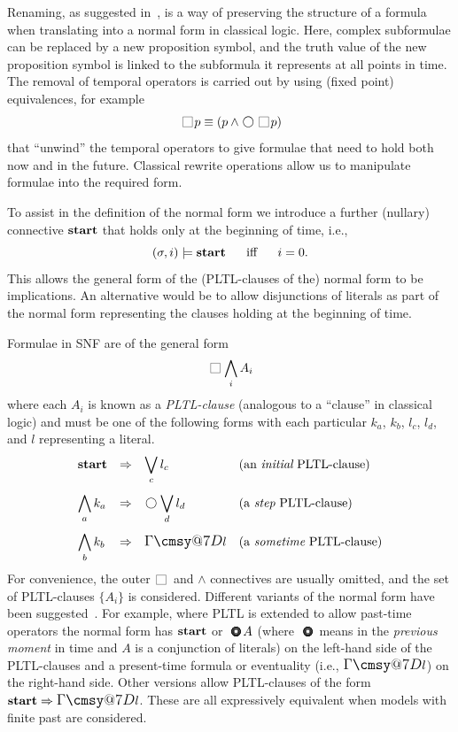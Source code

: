 \documentclass[nohyperref]{acmtrans2f}
\makeatletter
\def\sometime{\mathord{\hbox{\large$\mathchar"0\cmsy@7D$}}}
\newcommand{\always}{\raisebox{-.2ex}{
                           \mbox{\unitlength=0.9ex
                           \begin{picture}(2,2)
                           \linethickness{0.06ex}
                           \put(0,0){\line(1,0){2}}
                           \put(0,2){\line(1,0){2}}
                           \put(0,0){\line(0,1){2}}
                           \put(2,0){\line(0,1){2}}
                           \end{picture}}}
                          \,}
\newcommand{\next}{\!\raisebox{-.2ex}{ %
                        \mbox{\unitlength=0.9ex
                        \begin{picture}(2,2)
                        \linethickness{0.06ex}
                        \put(1,1){\circle{2}} %
                        \end{picture}}}       %
                        \,}
\newcommand{\slast}{\raisebox{-.2ex}{
                        \mbox{\unitlength=0.9ex
                        \begin{picture}(2,2)
                        \linethickness{0.9ex}   %
                        \put(1,1){\circle{0.9}}
                        \put(1,1){\circle{1.0}}
                        \put(1,1){\circle{1.2}}
                        \put(1,1){\circle{1.4}}
                        \put(1,1){\circle{1.6}}
                        \put(1,1){\circle{1.8}}
                        \put(1,1){\circle{1.86}}
                        \put(1,1){\circle{1.92}}
                        \end{picture}}}
                        \,}
\let\imp=\Rightarrow
\def\lstart{\hbox{\rm\bf start}}
\makeatother
\begin{document}
Renaming, as suggested in~, is a way of
preserving the structure of a formula when translating into a normal
form in classical logic. Here, complex subformulae can be replaced by
a new proposition symbol, and the truth value of the new proposition symbol
is linked 
to the subformula it represents at all points in time. The removal of
temporal operators is carried out by using (fixed point) equivalences,
for example
$$
\always p \equiv (p \land \next \always p)
$$
that ``unwind'' the temporal operators to give formulae that need to
hold both now and in the future. Classical rewrite operations allow us
to manipulate formulae into the required form.

To assist in the definition of the normal form we introduce a further
(nullary) connective $\lstart$ that holds only at the beginning of time,
i.e.,
$$
 (\sigma, i) \models \lstart~~~~ \mbox{ iff }~~~~ i =0.
$$
This allows the general form of the (PLTL-clauses of the) normal form to be implications. An
alternative would be to allow disjunctions of literals as part of the
normal form representing the clauses holding at the beginning of time.

Formulae in SNF are of the general form
 $$
 \always\bigwedge_i A_i
 $$
%
where each $A_i$ is known as a {\em PLTL-clause\/} (analogous to a ``clause''
in classical logic)
and must be one of the following forms with each particular $k_a$,
$k_b$, $l_c$, $l_d$, and $l$ representing a literal.
%
$$
\begin{array}{lcll}
\lstart    &\imp & \displaystyle\bigvee_{c} l_c
	 \qquad& \hbox{\rm (an {\em initial} PLTL-clause)}\\[4ex]
\displaystyle\bigwedge_{a} k_a        &\imp 
	 & \next \displaystyle\bigvee_{d} l_d
		 & \hbox{\rm (a {\em step} PLTL-clause)}\\[4ex]
\displaystyle\bigwedge_{b} k_b        &\imp & \sometime l
		 & \hbox{\rm (a {\em sometime} PLTL-clause)}
\end{array}
$$
%
For convenience, the outer $\!\always$ and $\land$ connectives are
usually omitted, and the set of PLTL-clauses $\{A_i\}$ is considered.
Different variants of the normal form have been
suggested~\cite{Fisher91normalizing,FisherNoel90syn,Fisher97:JLC}. For
example, where PLTL is extended to allow past-time operators the normal
form has $\lstart$ or $\slast A$ (where $\slast$ means in the {\em
previous moment} in time and $A$ is a conjunction of literals) on the
left-hand side of the PLTL-clauses and a present-time formula or eventuality
(i.e., $\sometime l$) on the right-hand side. Other versions allow
PLTL-clauses of the form $\lstart \imp \sometime l$.  These are all
expressively equivalent when models with finite past are considered.
\end{document}
